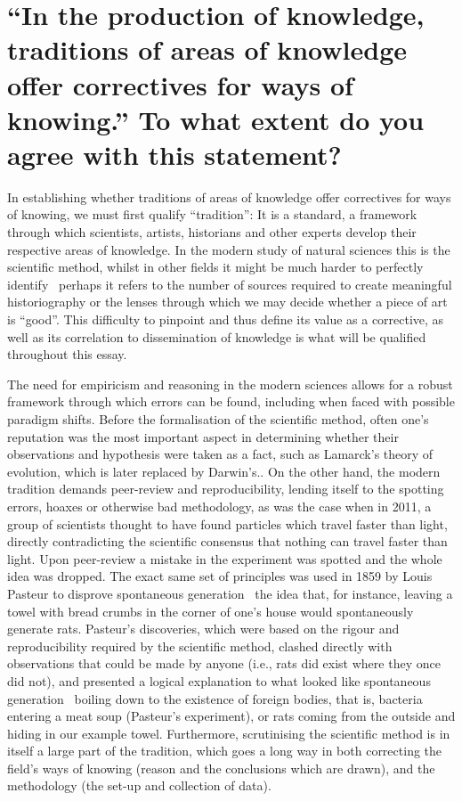 \documentclass[12pt,a4paper]{article}
\begin{document}
\section*{“In the production of knowledge, traditions of areas of knowledge offer correctives for ways of knowing.” To what extent do you agree with this statement?}

In establishing whether traditions of areas of knowledge  offer correctives for ways of knowing, we must first qualify ``tradition'': It is a standard, a framework through which scientists, artists, historians and other experts develop their respective areas of knowledge. In the modern study of natural sciences this is the scientific method, whilst in other fields it might be much harder to perfectly identify \textendash\ perhaps it refers to the number of sources required to create meaningful historiography or the lenses through which we may decide whether a piece of art is ``good''. This difficulty to pinpoint and thus define its value as a corrective, as well as its correlation to dissemination of knowledge is what will be qualified throughout this essay.

The need for empiricism and reasoning in the modern sciences allows for a robust framework through which errors can be found, including when faced with possible paradigm shifts. Before the formalisation of the scientific method, often one's reputation was the most important aspect in determining whether their observations and hypothesis were taken as a fact, such as Lamarck's theory of evolution, which is later replaced by Darwin's.. On the other hand, the modern tradition demands peer-review and reproducibility, lending itself to the spotting errors, hoaxes or otherwise bad methodology, as was the case when in 2011, a group of scientists thought to have found particles which travel faster than light, directly contradicting the scientific consensus that nothing can travel faster than light. Upon peer-review a mistake in the experiment was spotted and the whole idea was dropped. The exact same set of principles was used in 1859 by Louis Pasteur to disprove spontaneous generation \textendash\ the idea that, for instance, leaving a towel with bread crumbs in the corner of one's house would spontaneously generate rats. Pasteur's discoveries, which were based on the rigour and reproducibility required by the scientific method, clashed directly with observations that could be made by anyone (i.e., rats did exist where they once did not), and presented a logical explanation to what looked like spontaneous generation \textendash\ boiling down to the existence of foreign bodies, that is, bacteria entering a meat soup (Pasteur's experiment), or rats coming from the outside and hiding in our example towel. Furthermore, scrutinising the scientific method is in itself a large part of the tradition, which goes a long way in both correcting the field's ways of knowing (reason and the conclusions which are drawn), and the methodology (the set-up and collection of data).
\end{document}
